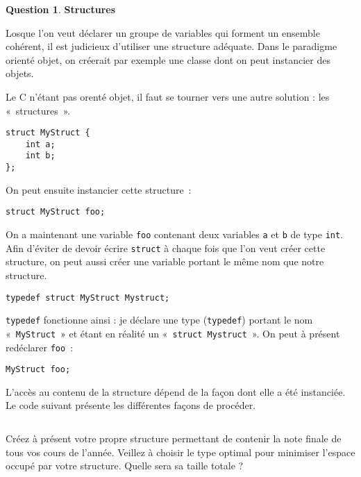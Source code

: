 \documentclass[11pt,a4paper,dvipsnames]{article}
\theoremstyle{definition}%
\newtheorem{Q}{Question}[] %
\begin{document}
\begin{Q} \textbf{Structures}

Losque l'on veut déclarer un groupe de variables qui forment un ensemble cohérent, il est judicieux d'utiliser une structure adéquate.
Dans le paradigme orienté objet, on créerait par exemple une classe dont on peut instancier des objets.

Le C n'étant pas orenté objet, il faut se tourner vers une autre solution : les «~structures~».

\begin{verbatim}
struct MyStruct {
	int a;
	int b;
};
\end{verbatim}

On peut ensuite instancier cette structure~:

\begin{verbatim}
struct MyStruct foo;
\end{verbatim}

On a maintenant une variable \texttt{foo} contenant deux variables \texttt{a} et \texttt{b} de type \texttt{int}.
Afin d'éviter de devoir écrire \texttt{struct} à chaque fois que l'on veut créer cette structure, on peut aussi créer une variable portant le même nom que notre structure.

\begin{verbatim}
typedef struct MyStruct Mystruct;
\end{verbatim}

\texttt{typedef} fonctionne ainsi : je déclare une type (\texttt{typedef}) portant le nom «~\texttt{MyStruct}~» et étant en réalité un «~\texttt{struct Mystruct}~».
On peut à présent redéclarer \texttt{foo}~:

\begin{verbatim}
MyStruct foo;
\end{verbatim}

L'accès au contenu de la structure dépend de la façon dont elle a été instanciée.
Le code suivant présente les différentes façons de procéder.

\inputminted{c}{struct.c}

Créez à présent votre propre structure permettant de contenir la note finale de tous vos cours de l'année.
Veillez à choisir le type optimal pour minimiser l'espace occupé par votre structure.
Quelle sera sa taille totale ?
\end{Q}
\end{document}
